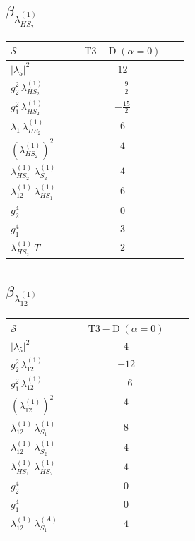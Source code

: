 \documentclass[9pt]{article}
\begin{document}
\subsection*{$ \beta_{\lambda_{HS_2}^{(1)}} $}
\begin{longtable}{@{}p{0.31\linewidth}c@{}}
\toprule
$\mathcal{S}$ & $ \mathrm{T3-D}\;(\alpha=0) $ \\
\midrule
$ |\lambda_5|^2 $ & $ 12 $ \\
$ g_2^2\,\lambda_{HS_2}^{(1)} $ & $ - \frac{9}{2} $ \\
$ g_1^2\,\lambda_{HS_2}^{(1)} $ & $ - \frac{15}{2} $ \\
$ \lambda_1\,\lambda_{HS_2}^{(1)} $ & $ 6 $ \\
$ \left(\lambda_{HS_2}^{(1)}\right)^2 $ & $ 4 $ \\
$ \lambda_{HS_2}^{(1)}\,\lambda_{S_2}^{(1)} $ & $ 4 $ \\
$ \lambda_{12}^{(1)}\,\lambda_{HS_1}^{(1)} $ & $ 6 $ \\
$ g_2^4 $ & $ 0 $ \\
$ g_1^4 $ & $ 3 $ \\
$ \lambda_{HS_2}^{(1)}\,T $ & $ 2 $ \\
\bottomrule
\end{longtable}
\subsection*{$ \beta_{\lambda_{12}^{(1)}} $}
\begin{longtable}{@{}p{0.31\linewidth}c@{}}
\toprule
$\mathcal{S}$ & $ \mathrm{T3-D}\;(\alpha=0) $ \\
\midrule
$ |\lambda_5|^2 $ & $ 4 $ \\
$ g_2^2\,\lambda_{12}^{(1)} $ & $ -12 $ \\
$ g_1^2\,\lambda_{12}^{(1)} $ & $ -6 $ \\
$ \left(\lambda_{12}^{(1)}\right)^2 $ & $ 4 $ \\
$ \lambda_{12}^{(1)}\,\lambda_{S_1}^{(1)} $ & $ 8 $ \\
$ \lambda_{12}^{(1)}\,\lambda_{S_2}^{(1)} $ & $ 4 $ \\
$ \lambda_{HS_1}^{(1)}\,\lambda_{HS_2}^{(1)} $ & $ 4 $ \\
$ g_2^4 $ & $ 0 $ \\
$ g_1^4 $ & $ 0 $ \\
$ \lambda_{12}^{(1)}\,\lambda_{S_1}^{(A)} $ & $ 4 $ \\
\bottomrule
\end{longtable}
\end{document}
